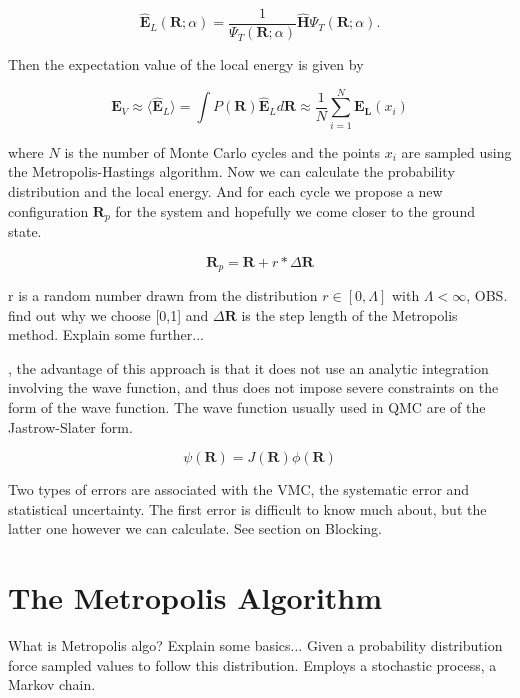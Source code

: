 $$\widehat{\mathbf{E}}_L(\mathbf{R};\alpha) = \frac{1}{\Psi_T(\mathbf{R};\alpha)}\widehat{\mathbf{H}}\Psi_T(\mathbf{R};\alpha).$$

Then the expectation value of the local energy is given by

$$\mathbf{E}_V \approx \langle \widehat{\mathbf{E}}_L\rangle = \int P(\mathbf{R}) \widehat{\mathbf{E}}_L d\mathbf{R} \approx \frac{1}{N} \sum_{i = 1}^N \mathbf{E_L}(x_i)$$

where $N$ is the number of Monte Carlo cycles and the points $x_i$ are sampled using the Metropolis-Hastings algorithm. Now we can calculate the probability distribution and the local energy. And for each cycle we propose a new configuration $\mathbf{R}_p$ for the system and hopefully we come closer to the ground state.

$$\mathbf{R}_p = \mathbf{R} + r \ast \Delta \mathbf{R}$$

r is a random number drawn from the distribution $r \in [0, \Lambda]$ with $\Lambda < \infty$, OBS. find out why we choose [0,1] and $\Delta \mathbf{R}$ is the step length of the Metropolis method. Explain some further... 

\cite{toulouse2016introduction}, the advantage of this approach is that it does not use an analytic integration involving the wave function, and thus does not impose severe constraints on the form of the wave function. 
The wave function usually used in QMC are of the Jastrow-Slater form. 

\begin{equation}
\psi(\mathbf{R}) = J(\mathbf{R}) \phi (\mathbf{R})
\end{equation}

Two types of errors are associated with the VMC, the systematic error and  statistical uncertainty. The first error is difficult to know much about, but the latter one however we can calculate. See section on Blocking.

\section{The Metropolis Algorithm}
What is Metropolis algo? Explain some basics...
Given a probability distribution force sampled values to follow this distribution. Employs a stochastic process, a Markov chain.


